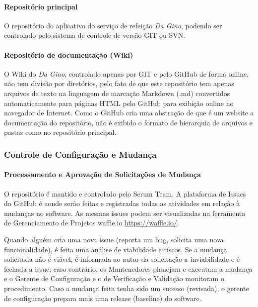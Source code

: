 \paragraph{Repositório principal}

O repositório do aplicativo do serviço de refeição \textit{Da Gino}, podendo ser controlado pelo sistema de controle de versão GIT ou SVN.

\paragraph{Repositório de documentação (Wiki)}

O Wiki do \textit{Da Gino}, controlado apenas por GIT e pelo GitHub de forma online, não tem divisão por diretórios, pelo fato de que este repositório tem apenas arquivos de texto na linguagem de marcação Markdown (.md) convertidos automaticamente para páginas HTML pelo GitHub para exibição online no navegador de Internet. Como o GitHub cria uma abstração de que é um website a documentação do repositório, não é exibido o formato de hierarquia de arquivos e pastas como no repositório principal.

\subsubsection{Controle de Configuração e Mudança}

\paragraph{Processamento e Aprovação de Solicitações de Mudança}

O repositório é mantido e controlado pelo Scrum Team. A plataforma de Issues do GitHub é aonde serão feitas e registradas todas as atividades em relação à mudanças no software. As mesmas issues podem ser visualizadas na ferramenta de Gerenciamento de Projetos waffle.io \url{https://waffle.io/}.

Quando alguém cria uma nova issue (reporta um bug, solicita uma nova funcionalidade), é feita uma análise de viabilidade e riscos. Se a mudança solicitada não é viável, é informada ao autor da solicitação a inviabilidade e é fechada a issue; caso contrário, os Mantenedores planejam e executam a mudança e o Gerente de Configuração e o de Verificação e Validação monitoram o procedimento. Caso a mudança feita tenha sido um sucesso (revisada), o gerente de configuração prepara mais uma release (baseline) do software.

